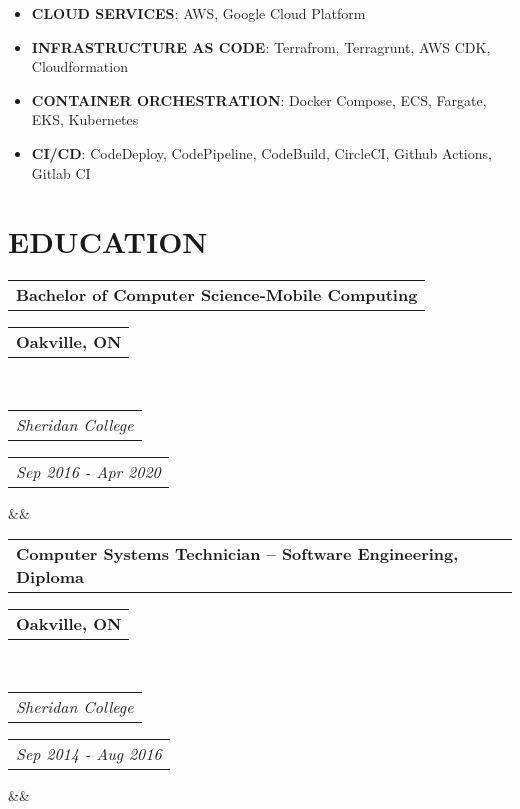 \documentclass[10pt,a4paper,roman]{moderncv}
\makeatletter
\newcommand*{\customcventry}[7][.15em]{
  \begin{tabular}{@{}l} 
    {\bfseries #4}
  \end{tabular}
  \hfill
  \begin{tabular}{l@{}}
     {\bfseries #5}
  \end{tabular} \\
  \begin{tabular}{@{}l} 
    {\itshape #3}
  \end{tabular}
  \hfill
  \begin{tabular}{l@{}}
     {\itshape #2}
  \end{tabular}
  \ifx&#7&%
  \else{\\%
    \begin{minipage}{\maincolumnwidth}%
      \small#7%
    \end{minipage}}\fi%
  \par\addvspace{#1}}
\makeatother
\begin{document}
{\begin{multicols}{2}
\begin{itemize}
    \item \textbf{CLOUD SERVICES}: AWS, Google Cloud Platform \\ \vspace*{-3.5mm}
    
    \item \textbf{INFRASTRUCTURE AS CODE}: Terrafrom, Terragrunt, AWS CDK, Cloudformation \\ \vspace*{-3.5mm}
    \item \textbf{CONTAINER ORCHESTRATION}: Docker Compose, ECS, Fargate, EKS, Kubernetes \\ \vspace*{-3.5mm}
    
    \item \textbf{CI/CD}: CodeDeploy, CodePipeline, CodeBuild, CircleCI, Github Actions, Gitlab CI \vspace*{-3.5mm}



    \end{itemize}
    \end{multicols}
\vspace*{-6.5mm}

\section{EDUCATION}
\vspace*{-1mm}

{\customcventry{Sep 2016 - Apr 2020}{Sheridan College}{Bachelor of Computer Science-Mobile Computing}{Oakville, ON}{}{}}

{\customcventry{Sep 2014 - Aug 2016}{Sheridan College}{Computer Systems Technician – Software Engineering, Diploma}{Oakville, ON}{}{}}
\vspace*{-2.5mm}
}
\end{document}
